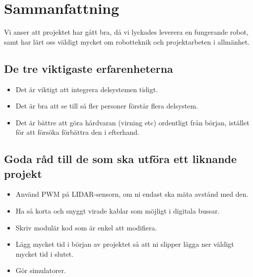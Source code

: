 \documentclass[a4paper,titlepage,12pt]{article}
\begin{document}
	\section{Sammanfattning}
    Vi anser att projektet har gått bra, då vi lyckades leverera en fungerande
    robot, samt har lärt oss väldigt mycket om robotteknik och projektarbeten i
    allmänhet.
	
	\subsection{De tre viktigaste erfarenheterna}
    \begin{itemize}
        \item Det är viktigt att integrera delsystemen tidigt.
        \item Det är bra att se till så fler personer förstår flera delsystem.
        \item Det är bättre att göra hårdvaran (virning etc) ordentligt från början, istället
            för att försöka förbättra den i efterhand.
    \end{itemize}
	
	\subsection{Goda råd till de som ska utföra ett liknande projekt}
    \begin{itemize}
        \item Använd PWM på LIDAR-sensorn, om ni endast ska mäta avstånd med
            den.
        \item Ha så korta och snyggt virade kablar som möjligt i digitala
            bussar.
        \item Skriv modulär kod som är enkel att modifiera.
        \item Lägg mycket tid i början av projektet så att ni slipper lägga ner
            väldigt mycket tid i slutet.
        \item Gör simulatorer.
    \end{itemize}

	
\end{document}
